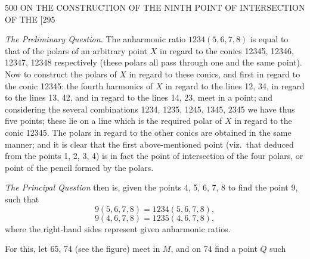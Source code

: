 \documentclass[11pt]{article}
\begin{document}
\newpage
\begin{center}
500 \hfill ON THE CONSTRUCTION OF THE NINTH POINT OF INTERSECTION OF THE \hfill \textsc{[295}
\end{center}

\textit{The Preliminary Question.} The anharmonic ratio $1234(5,6,7,8)$ is equal to that
of the polars of an arbitrary point $X$ in regard to the conics 12345, 12346, 12347,
12348 respectively (these polars all pass through one and the same point). Now to
construct the polars of $X$ in regard to these conics, and first in regard to the conic
12345: the fourth harmonics of $X$ in regard to the lines 12, 34, in regard to the lines
13, 42, and in regard to the lines 14, 23, meet in a point; and considering the several
combinations 1234, 1235, 1245, 1345, 2345 we have thus five points; these lie on a
line which is the required polar of $X$ in regard to the conic 12345. The polars in
regard to the other conics are obtained in the same manner; and it is clear that the
first above-mentioned point (viz.\ that deduced from the points 1, 2, 3, 4) is in fact
the point of intersection of the four polars, or point of the pencil formed by the polars.

\textit{The Principal Question} then is, given the points 4, 5, 6, 7, 8 to find the point 9,
such that
\[ 9(5,6,7,8) = 1234(5,6,7,8), \]
\[ 9(4,6,7,8) = 1235(4,6,7,8), \]
where the right-hand sides represent given anharmonic ratios.

For this, let 65, 74 (see the figure) meet in $M$, and on 74 find a point $Q$ such
\end{document}
